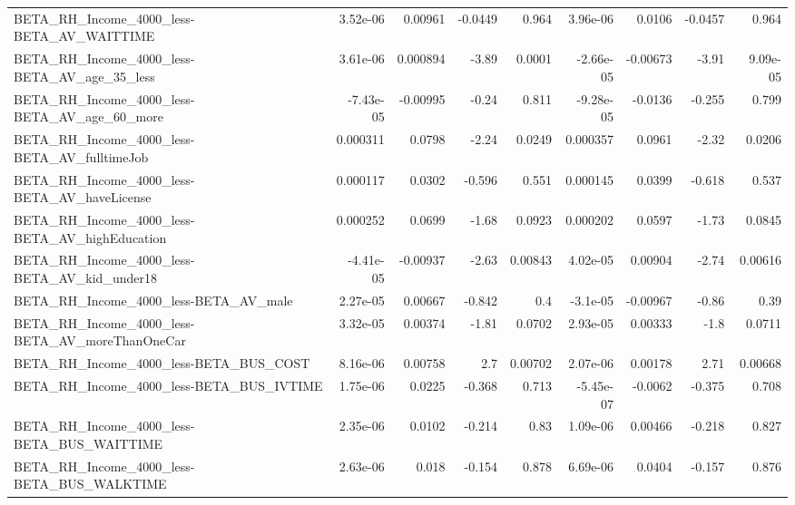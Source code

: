 \begin{tabular}{lrrrrrrrr}
BETA\_RH\_Income\_4000\_less-BETA\_AV\_WAITTIME          &    3.52e-06 &      0.00961 &  -0.0449 &    0.964 &   3.96e-06 &      0.0106 &      -0.0457 &         0.964 \\
BETA\_RH\_Income\_4000\_less-BETA\_AV\_age\_35\_less       &    3.61e-06 &     0.000894 &    -3.89 &   0.0001 &  -2.66e-05 &    -0.00673 &        -3.91 &      9.09e-05 \\
BETA\_RH\_Income\_4000\_less-BETA\_AV\_age\_60\_more       &   -7.43e-05 &     -0.00995 &    -0.24 &    0.811 &  -9.28e-05 &     -0.0136 &       -0.255 &         0.799 \\
BETA\_RH\_Income\_4000\_less-BETA\_AV\_fulltimeJob       &    0.000311 &       0.0798 &    -2.24 &   0.0249 &   0.000357 &      0.0961 &        -2.32 &        0.0206 \\
BETA\_RH\_Income\_4000\_less-BETA\_AV\_haveLicense       &    0.000117 &       0.0302 &   -0.596 &    0.551 &   0.000145 &      0.0399 &       -0.618 &         0.537 \\
BETA\_RH\_Income\_4000\_less-BETA\_AV\_highEducation     &    0.000252 &       0.0699 &    -1.68 &   0.0923 &   0.000202 &      0.0597 &        -1.73 &        0.0845 \\
BETA\_RH\_Income\_4000\_less-BETA\_AV\_kid\_under18       &   -4.41e-05 &     -0.00937 &    -2.63 &  0.00843 &   4.02e-05 &     0.00904 &        -2.74 &       0.00616 \\
BETA\_RH\_Income\_4000\_less-BETA\_AV\_male              &    2.27e-05 &      0.00667 &   -0.842 &      0.4 &   -3.1e-05 &    -0.00967 &        -0.86 &          0.39 \\
BETA\_RH\_Income\_4000\_less-BETA\_AV\_moreThanOneCar    &    3.32e-05 &      0.00374 &    -1.81 &   0.0702 &   2.93e-05 &     0.00333 &         -1.8 &        0.0711 \\
BETA\_RH\_Income\_4000\_less-BETA\_BUS\_COST             &    8.16e-06 &      0.00758 &      2.7 &  0.00702 &   2.07e-06 &     0.00178 &         2.71 &       0.00668 \\
BETA\_RH\_Income\_4000\_less-BETA\_BUS\_IVTIME           &    1.75e-06 &       0.0225 &   -0.368 &    0.713 &  -5.45e-07 &     -0.0062 &       -0.375 &         0.708 \\
BETA\_RH\_Income\_4000\_less-BETA\_BUS\_WAITTIME         &    2.35e-06 &       0.0102 &   -0.214 &     0.83 &   1.09e-06 &     0.00466 &       -0.218 &         0.827 \\
BETA\_RH\_Income\_4000\_less-BETA\_BUS\_WALKTIME         &    2.63e-06 &        0.018 &   -0.154 &    0.878 &   6.69e-06 &      0.0404 &       -0.157 &         0.876 \\

\end{tabular}
